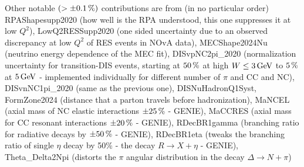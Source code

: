 Other notable $\left(>\pm\unit[0.1]{\%}\right)$ contributions are from (in no particular order)
RPAShapesupp2020 (how well is the RPA understood, this one suppresses it at low $Q^2$),
LowQ2RESSupp2020 (one sided uncertainty due to an observed discrepancy at low $Q^2$ of RES events in NOvA data),
MECShape2024Nu (neutrino energy dependence of the MEC fit), DISvpNC2pi\_2020 (normalization uncertainty for transition-DIS events, starting at $\unit[50]{\%}$ at high $W\leq\unit[3]{GeV}$ to $\unit[5]{\%}$ at $\unit[5]{GeV}$ - implemented individually for different number of $\pi$ and CC and NC),
DISvnNC1pi\_2020 (same as the previous one),
DISNuHadronQ1Syst, FormZone2024 (distance that a parton travels before hadronization),
MaNCEL (axial mass of NC elastic interactions $\pm\unit[25]{\%}$ - GENIE),
MaCCRES (axial mass for CC resonant interactions $\pm\unit[20]{\%}$ - GENIE),
RDecBR1gamma (branching ratio for radiative decays by $\pm\unit[50]{\%}$ - GENIE),
RDecBR1eta (tweaks the branching ratio of single $\eta$ decay by 50\% - the decay $R\rightarrow X+\eta$ - GENIE),
Theta_Delta2Npi (distorts the $\pi$ angular distribution in the decay $\Delta\rightarrow N+\pi$)
\fi